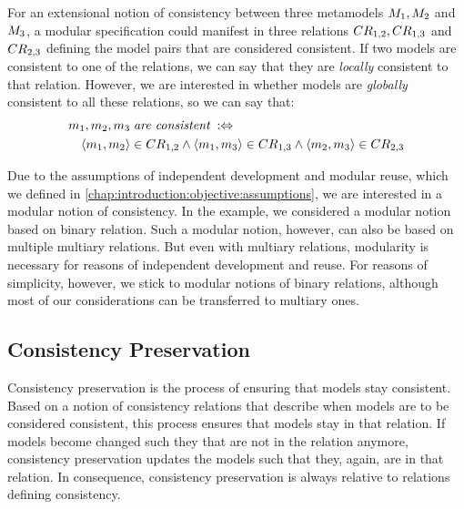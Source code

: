 For an extensional notion of consistency between three metamodels $\metamodel{M}{1}, \metamodel{M}{2}$ and $\metamodel{M}{3}$, a modular specification could manifest in three relations $\consistencyrelation{CR}{1,2}, \consistencyrelation{CR}{1,3}$ and $\consistencyrelation{CR}{2,3}$ defining the model pairs that are considered consistent.
If two models are consistent to one of the relations, we can say that they are \emph{locally} consistent to that relation.
However, we are interested in whether models are \emph{globally} consistent to all these relations, so we can say that:
\begin{align*}
    & \model{m}{1}, \model{m}{2}, \model{m}{3} \mathtextspacearound{are consistent} \equivalentperdefinition \\
    & \formulaskip 
    \tupled{\model{m}{1},\model{m}{2}} \in \consistencyrelation{CR}{1,2} \land \tupled{\model{m}{1},\model{m}{3}} \in \consistencyrelation{CR}{1,3} \land \tupled{\model{m}{2},\model{m}{3}} \in \consistencyrelation{CR}{2,3}
\end{align*}

Due to the assumptions of independent development and modular reuse, which we defined in \autoref{chap:introduction:objective:assumptions}, we are interested in a modular notion of consistency.
In the example, we considered a modular notion based on binary relation. Such a modular notion, however, can also be based on multiple multiary relations. 
But even with multiary relations, modularity is necessary for reasons of independent development and reuse. %
For reasons of simplicity, however, we stick to modular notions of binary relations, although most of our considerations can be transferred to multiary ones.


\subsection{Consistency Preservation}
\label{chap:correctness:notions_consistency:preservation}

Consistency preservation is the process of ensuring that models stay consistent.
Based on a notion of consistency relations that describe when models are to be considered consistent, this process ensures that models stay in that relation. 
If models become changed such they that are not in the relation anymore, consistency preservation updates the models such that they, again, are in that relation.
In consequence, consistency preservation is always relative to relations defining consistency.

